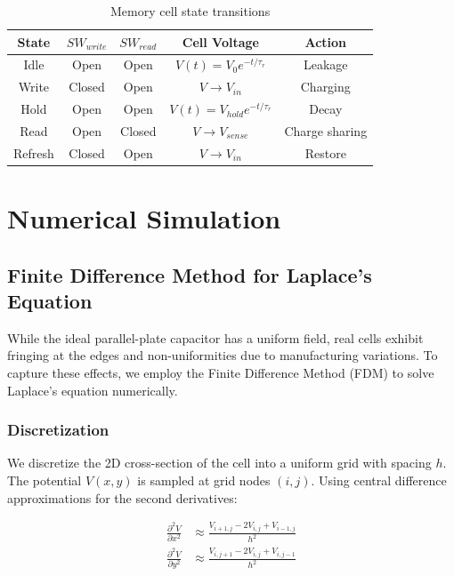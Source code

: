 \documentclass[12pt,a4paper]{report}
\begin{document}
\begin{table}[H]
    \centering
    \caption{Memory cell state transitions}
    \label{tab:states}
    \begin{tabular}{@{}ccccc@{}}
        \toprule
        \textbf{State} & $SW_{write}$ & $SW_{read}$ & \textbf{Cell Voltage} & \textbf{Action} \\
        \midrule
        Idle & Open & Open & $V(t) = V_0 e^{-t/\tau_r}$ & Leakage \\
        Write & Closed & Open & $V \to V_{in}$ & Charging \\
        Hold & Open & Open & $V(t) = V_{hold} e^{-t/\tau_r}$ & Decay \\
        Read & Open & Closed & $V \to V_{sense}$ & Charge sharing \\
        Refresh & Closed & Open & $V \to V_{in}$ & Restore \\
        \bottomrule
    \end{tabular}
\end{table}

\chapter{Numerical Simulation}
\label{ch:simulation}

\section{Finite Difference Method for Laplace's Equation}

While the ideal parallel-plate capacitor has a uniform field, real cells exhibit fringing at the edges and non-uniformities due to manufacturing variations. To capture these effects, we employ the Finite Difference Method (FDM) to solve Laplace's equation numerically.

\subsection{Discretization}

We discretize the 2D cross-section of the cell into a uniform grid with spacing $h$. The potential $V(x,y)$ is sampled at grid nodes $(i,j)$. Using central difference approximations for the second derivatives:

\begin{align}
    \frac{\partial^2 V}{\partial x^2} &\approx \frac{V_{i+1,j} - 2V_{i,j} + V_{i-1,j}}{h^2} \\
    \frac{\partial^2 V}{\partial y^2} &\approx \frac{V_{i,j+1} - 2V_{i,j} + V_{i,j-1}}{h^2}
\end{align}
\end{document}

